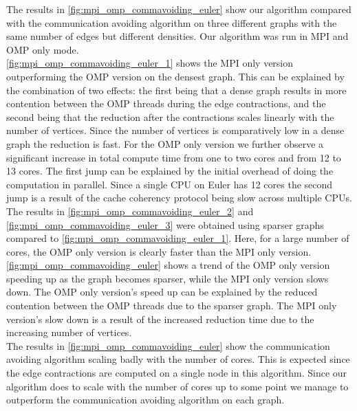 The results in \autoref{fig:mpi_omp_commavoiding_euler} show our algorithm compared with the
communication avoiding algorithm \cite{comm_avoiding} on three different graphs with the same
number of edges but different densities. Our algorithm was run in MPI and OMP only mode.\\
\autoref{fig:mpi_omp_commavoiding_euler_1} shows the MPI only version outperforming the OMP version on the densest graph. This can be explained by the combination of two effects:
the first being that a dense graph results in more contention between the OMP threads during the
edge contractions, and the second being that the reduction after the contractions scales linearly
with the number of vertices. Since the number of vertices is comparatively low in a dense graph the
reduction is fast. For the OMP only version we further observe a significant increase in total
compute time from one to two cores and from 12 to 13 cores. The first jump can be explained by the
initial overhead of doing the computation in parallel. Since a single CPU on Euler has 12 cores the
second jump is a result of the cache coherency protocol being slow across multiple CPUs.\\
The results in \autoref{fig:mpi_omp_commavoiding_euler_2} and
\autoref{fig:mpi_omp_commavoiding_euler_3} were obtained using sparser graphs compared to
\autoref{fig:mpi_omp_commavoiding_euler_1}. Here, for a large number of cores, the OMP only version
is clearly faster than the MPI only version. \autoref{fig:mpi_omp_commavoiding_euler} shows a trend
of the OMP only version speeding up as the graph becomes sparser, while the MPI only version slows
down. The OMP only version's speed up can be explained by the reduced contention between the OMP
threads due to the sparser graph. The MPI only version's slow down is a result of the increased
reduction time due to the increasing number of vertices.\\
The results in \autoref{fig:mpi_omp_commavoiding_euler} show the communication avoiding algorithm
scaling badly with the number of cores. This is expected since the edge contractions are computed
on a single node in this algorithm. Since our algorithm does to scale with the number of cores up
to some point we manage to outperform the communication avoiding algorithm on each graph.



